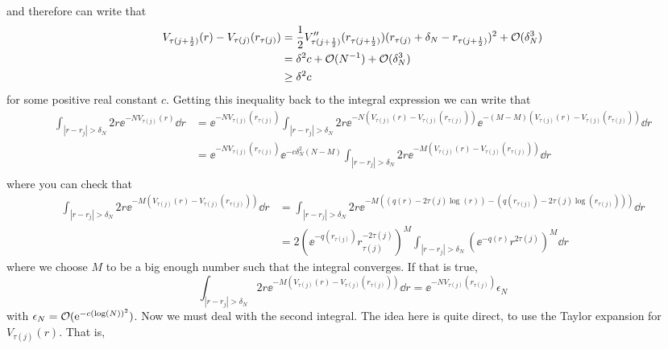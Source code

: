 and therefore can write that
\begin{align}
	V_{\tau(j+\frac{1}{2})}(r) - V_{\tau(j)}(r_{\tau(j)}) & =  \frac{1}{2} V''_{\tau(j+\frac{1}{2})}(r_{\tau(j+\frac{1}{2})}) (r_{\tau(j)} + \delta_N - r_{\tau(j+\frac{1}{2})})^2 + \mathcal{O}(\delta_N^3) \\
	& = \delta^2 c + \mathcal{O}(N^{-1}) + \mathcal{O}(\delta_N^3) \\
	& \geq  \delta^2 c
\end{align}
for some positive real constant $c$. Getting this inequality back to the integral expression we can write that 
\begin{align}
	\int_{|r - r_j| > \delta_N} 2r \ee^{-N V_{\tau(j)}(r)} \dd r & = \ee^{-N V_{\tau(j)}(r_{\tau(j)})} \int_{|r - r_j| > \delta_N} 2r \ee^{-N \left( V_{\tau(j)}(r) - V_{\tau(j)}(r_{\tau(j)}) \right)}  \ee^{-(M-M) \left( V_{\tau(j)}(r) - V_{\tau(j)}(r_{\tau(j)}) \right)} \dd r \\
   & = \ee^{-N V_{\tau(j)}(r_{\tau(j)})}  \ee^{- c \delta_N^2 (N - M)} \int_{|r - r_j| > \delta_N} 2r \ee^{-M \left( V_{\tau(j)}(r) - V_{\tau(j)}(r_{\tau(j)}) \right)} \dd r \\
\end{align}
where you can check that
\begin{align}
	\int_{|r - r_j| > \delta_N} 2r \ee^{-M \left( V_{\tau(j)}(r) - V_{\tau(j)}(r_{\tau(j)}) \right)} \dd r & = \int_{|r - r_j| > \delta_N} 2r \ee^{-M \left( (q(r) - 2 \tau(j) \log(r)) - (q(r_{\tau(j)}) - 2 \tau(j) \log(r_{\tau(j)})) \right)} \dd r  \\
	& = 2 \left( \ee^{-q(r_{\tau(j)})} r_{\tau(j)}^{-2 \tau(j)} \right)^M \int_{|r - r_j| > \delta_N} \left( \ee^{-q(r)} r^{2 \tau(j)} \right)^M \dd r
\end{align}
where we choose $M$ to be a big enough number such that the integral converges. If that is true, 
\begin{equation}
	\int_{|r - r_j| > \delta_N} 2r \ee^{-M \left( V_{\tau(j)}(r) - V_{\tau(j)}(r_{\tau(j)}) \right)} \dd r = \ee^{-N V_{\tau(j)}(r_{\tau(j)})} \epsilon_N
\end{equation}
with $\epsilon_N = \mathcal{O}(\operatorname{e}^{-c(\log(N))^2})$. Now we must deal with the second integral. The idea here is quite direct, to use the Taylor expansion for $V_{\tau(j)}(r)$. That is,  
